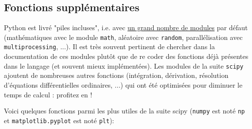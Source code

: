 \documentclass{article}
\begin{document}
\subsection*{Fonctions supplémentaires}

Python est livré "piles incluses", i.e. avec \href{https://docs.python.org/3/py-modindex.html}{un grand nombre de modules} par défaut (mathématiques avec le module \texttt{math}, aléatoire avec \texttt{random}, parallélisation avec \texttt{multiprocessing}, ...). Il est très souvent pertinent de chercher dans la documentation de ces modules plutôt que de re coder des fonctions déjà présentes dans le langage (et souvent mieux implémentées). Les modules de la suite \texttt{scipy} ajoutent de nombreuses autres fonctions (intégration, dérivation, résolution d'équations différentielles ordinaires, ...) qui ont été optimisées pour diminuer le temps de calcul : profitez en !

Voici quelques fonctions parmi les plus utiles de la suite scipy (\texttt{numpy} est noté \texttt{np} et \texttt{matplotlib.pyplot} est noté \texttt{plt}):
\end{document}
